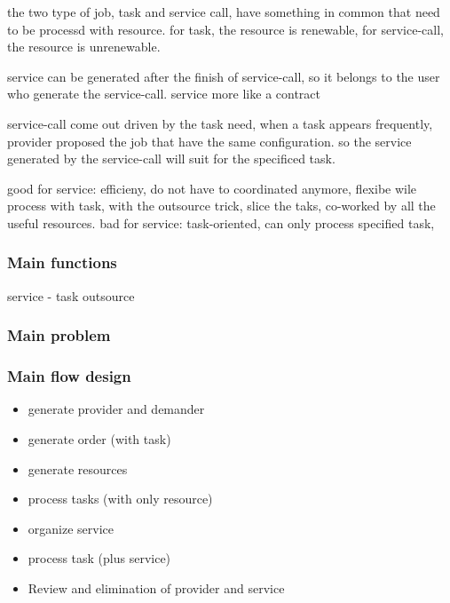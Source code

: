 the two type of job, task and service call, have something in common that need to be processd with resource. for task, the resource is renewable, for service-call, the resource is unrenewable.

service can be generated after the finish of service-call, so it belongs to the user who generate the service-call. service more like a contract

service-call come out driven by the task need, when a task appears frequently, provider proposed the job that have the same configuration. so the service generated by the service-call will suit for the specificed task.

good for service: efficieny, do not have to coordinated anymore, flexibe wile process with task, with the outsource trick, slice the taks, co-worked by all the useful resources.
bad for service: task-oriented, can only process specified task,


\subsubsection{Main functions} %
\label{ssub:main_functions}
service - task outsource

\subsubsection{Main problem} %
\label{ssub:main_problem}


\subsubsection{Main flow design} %
\label{ssub:main_flow_design}
\begin{itemize}
    \item generate provider and demander
    \item generate order (with task)
    \item generate resources
    \item process tasks (with only resource)
    \item organize service
    \item process task (plus service)
    \item Review and elimination of provider and service
\end{itemize}

